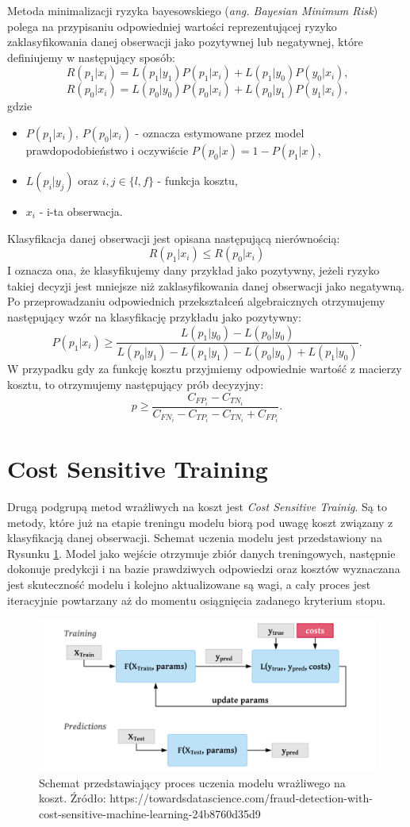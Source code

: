 \documentclass[openany]{book}
\begin{document}
	Metoda minimalizacji ryzyka bayesowskiego (\textit{ang. Bayesian Minimum Risk}) polega na przypisaniu odpowiedniej wartości reprezentującej ryzyko zaklasyfikowania danej obserwacji jako pozytywnej lub negatywnej, które definiujemy w następujący sposób:
	$$ R(p_1|x_i) = L(p_1|y_1)P(p_1|x_i) + L(p_1|y_0)P(y_0|x_i) \text{,}$$
	$$ R(p_0|x_i) = L(p_0|y_0)P(p_0|x_i) + L(p_0|y_1)P(y_1|x_i) \text{,}$$
	gdzie
	\begin{itemize}
		\item $P(p_1|x_i)$, $P(p_0|x_i)$ - oznacza estymowane przez model prawdopodobieństwo i oczywiście $P(p_0|x) = 1 - P(p_1|x)$,
		\item $L(p_{i}|y_{j})$ oraz $i,j \in \{l,f\}$ - funkcja kosztu,
		\item $x_i$ - i-ta obserwacja.
	\end{itemize}{}
	Klasyfikacja danej obserwacji jest opisana następującą nierównością:
	$$ R(p_1|x_i) \leq R(p_0|x_i)$$
	I oznacza ona, że klasyfikujemy dany przykład jako pozytywny, jeżeli ryzyko takiej decyzji jest mniejsze niż zaklasyfikowania danej obserwacji jako negatywną. 
	Po przeprowadzaniu odpowiednich przekształceń algebraicznych otrzymujemy następujący wzór na klasyfikację przykładu jako pozytywny:
	$$ P(p_1|x_i) \ge \frac{L(p_1|y_0) - L(p_0|y_0)}{L(p_0|y_1) - L(p_1|y_1) - L(p_0|y_0) + L(p_1|y_0)} \text{.}$$
	W przypadku gdy za funkcję kosztu przyjmiemy odpowiednie wartość z macierzy kosztu, to otrzymujemy następujący prób decyzyjny:
	$$ p \ge \frac{C_{FP_i} - C_{TN_i}}{C_{FN_i} - C_{TP_i} - C_{TN_i} + C_{FP_i}} \text{.}$$

\section{Cost Sensitive Training}
	Drugą podgrupą metod wrażliwych na koszt jest \textit{Cost Sensitive Trainig}. Są to metody, które już na etapie treningu modelu biorą pod uwagę koszt związany z klasyfikacją danej obserwacji. Schemat uczenia modelu jest przedstawiony na Rysunku \ref{cst}. Model jako wejście otrzymuje zbiór danych treningowych, następnie dokonuje predykcji i na bazie prawdziwych odpowiedzi oraz kosztów wyznaczana jest skuteczność modelu i kolejno aktualizowane są wagi, a cały proces jest iteracyjnie powtarzany aż do momentu osiągnięcia zadanego kryterium stopu.
	\begin{figure}
		\includegraphics[width=\linewidth]{images/cost_sensitive_training.png}
		\caption{Schemat przedstawiający proces uczenia modelu wrażliwego na koszt. Źródło: https://towardsdatascience.com/fraud-detection-with-cost-sensitive-machine-learning-24b8760d35d9}
		\label{cst}
	\end{figure}	
\end{document}
